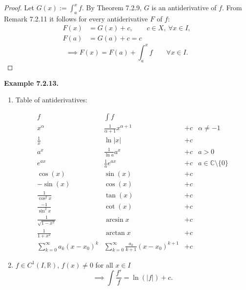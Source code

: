 \documentclass[12pt]{article}
\begin{document}
\begin{proof}
Let $G(x):=\int_a^x f$. By Theorem 7.2.9, $G$ is an antiderivative of $f$. From
Remark 7.2.11 it follows for every antiderivative $F$ of $f$:
\begin{align*}
F(x)&=G(x)+c,\qquad c\in X,\ \forall x\in I,\\
F(a)&=G(a)+c=c
\end{align*}
\[
\implies F(x)=F(a)+\int_a^x f\qquad\forall x\in I.
\]
\end{proof}

\par\vspace{6pt}\noindent\textbf{Example 7.2.13.}\itshape\space
\begin{enumerate}
    \item Table of antiderivatives:

    \upshape
    \[
    \renewcommand{\arraystretch}{1.4}
    \begin{array}{c|c|cc}
    f & \int f & & \\\hline
    x^\alpha & \frac{1}{\alpha+1}x^{\alpha+1} & +c & \alpha\neq-1\\
    \frac{1}{x} & \ln|x| & +c & \\
    a^x & \frac{1}{\ln a}a^x & +c & a>0\\
    e^{ax} & \frac{1}{a}e^{ax} & +c & a\in\mathbb C\setminus\{0\}\\
    \cos(x) & \sin(x) & +c & \\
    -\sin(x) & \cos(x) & +c & \\
    \frac{1}{\cos^2 x} & \tan(x) & +c & \\
    \frac{-1}{\sin^2 x} & \cot(x) & +c & \\
    \frac{1}{\sqrt{1-x^2}} & \arcsin x & +c & \\
    \frac{1}{1+x^2} & \arctan x & +c & \\
    \sum_{k=0}^{\infty}a_k(x-x_0)^k & \sum_{k=0}^{\infty}\frac{a_k}{k+1}(x-x_0)^{k+1} & +c &
    \end{array}
    \]
    \itshape

    \item $f\in C^1(I,\mathbb R)$, $f(x)\neq 0$ for all $x\in I$
    \[
    \implies\int\frac{f'}{f}=\ln(|f|)+c.
    \]
\end{enumerate}
\upshape
\end{document}
